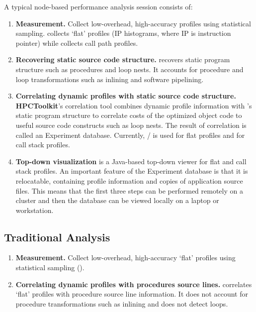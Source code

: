 \documentclass[english]{article}
\begin{document}
A typical node-based performance analysis session consists of:
\begin{enumerate}
\item \textbf{Measurement.}  
Collect low-overhead, high-accuracy profiles using statistical sampling.
 collects `flat' profiles (IP histograms, where IP is instruction pointer) while  collects call path profiles.

\item \textbf{Recovering static source code structure.} 
 recovers static program structure such as procedures and loop nests.
It accounts for procedure and loop transformations such as inlining and software pipelining.

\item \textbf{Correlating dynamic profiles with static source code structure.} 
\textbf{HPCToolkit}'s correlation tool combines dynamic profile information with 's static program structure to correlate costs of the optimized object code to useful source code constructs such as loop nests.
The result of correlation is called an Experiment database.
Currently, / is used for flat profiles and  for call stack profiles.

\item \textbf{Top-down visualization}
 is a Java-based top-down viewer for flat and call stack profiles.
An important feature of the Experiment database is that it is relocatable, containing profile information and copies of application source files.
This means that the first three steps can be performed remotely on a cluster and then the database can be viewed locally on a laptop or workstation.
\end{enumerate}

\subsection{Traditional Analysis}

\begin{enumerate}
\item \textbf{Measurement.}  
Collect low-overhead, high-accuracy `flat' profiles using statistical sampling ().

\item \textbf{Correlating dynamic profiles with procedures source lines.} 
 correlates `flat' profiles with procedure source line information.
It does not account for procedure transformations such as inlining and does not detect loops.
\end{enumerate}
\end{document}

